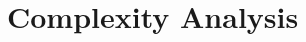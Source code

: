 \documentclass[11pt,letterpaper]{article}
\newcommand\0{{\Vector{0}}}
\newcommand\1{{\Vector{1}}}
\numberwithin{assumption}{section}
\numberwithin{definition}{section}
\numberwithin{theorem}{section}
\numberwithin{remark}{section}
\begin{document}


\section{Complexity Analysis}\label{sec:complexity}
\end{document}
